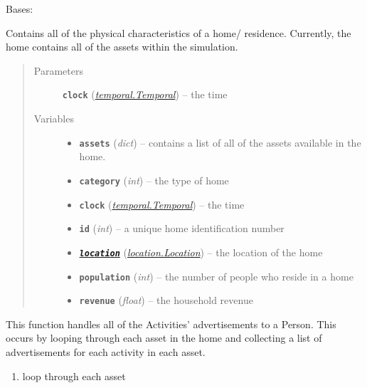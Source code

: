 \documentclass[letterpaper,10pt,english]{sphinxmanual}
\begin{document}
\begin{fulllineitems}
\label{home:home.Home}
Bases: 

Contains all of the physical characteristics of a home/ residence. Currently, the home     contains all of the assets within the simulation.
\begin{quote}\begin{description}
\item[{Parameters}] \leavevmode
\textbf{\texttt{clock}} ({\hyperref[temporal:temporal.Temporal]{\emph{\emph{temporal.Temporal}}}}) -- the time

\item[{Variables}] \leavevmode\begin{itemize}
\item {} 
\textbf{\texttt{assets}} (\emph{dict}) -- contains a list of all of the assets available in the home.

\item {} 
\textbf{\texttt{category}} (\emph{int}) -- the type of home

\item {} 
\textbf{\texttt{clock}} ({\hyperref[temporal:temporal.Temporal]{\emph{\emph{temporal.Temporal}}}}) -- the time

\item {} 
\textbf{\texttt{id}} (\emph{int}) -- a unique home identification number

\item {} 
{\hyperref[location:module-location]{\emph{\textbf{\texttt{location}}}}} ({\hyperref[location:location.Location]{\emph{\emph{location.Location}}}}) -- the location of the home

\item {} 
\textbf{\texttt{population}} (\emph{int}) -- the number of people who reside in a home

\item {} 
\textbf{\texttt{revenue}} (\emph{float}) -- the household revenue

\end{itemize}

\end{description}\end{quote}

\begin{fulllineitems}
\label{home:home.Home.advertise}
This function handles all of the Activities' advertisements to a Person. This occurs by looping         through each asset in the home and collecting a list of advertisements for each activity in each asset.
\begin{enumerate}
\item {} 
loop through each asset


\end{enumerate}
\end{fulllineitems}
\end{fulllineitems}
\end{document}
